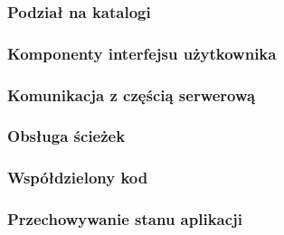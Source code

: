 \subsubsection{Podział na katalogi}

\subsubsection{Komponenty interfejsu użytkownika}

\subsubsection{Komunikacja z częścią serwerową}

\subsubsection{Obsługa ścieżek}

\subsubsection{Współdzielony kod}

\subsubsection{Przechowywanie stanu aplikacji}